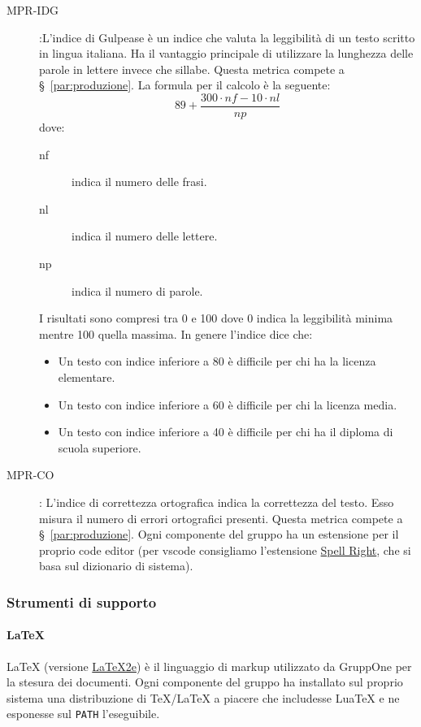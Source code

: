 \documentclass[../../norme-di-progetto.tex]{subfiles}
\begin{document}
\begin{description}
  \item [MPR-IDG]:L'indice di Gulpease è un indice che valuta la leggibilità di un testo scritto in lingua italiana. Ha il vantaggio principale di utilizzare la lunghezza delle parole in lettere invece che sillabe. Questa metrica compete a §~\ref{par:produzione}. La formula per il calcolo è la seguente:
  \[
    89 +\frac{300\cdot nf-10\cdot nl}{np}
  \]
  dove:
  \begin{description}
    \item [nf] indica il numero delle frasi.
    \item [nl] indica il numero delle lettere.
    \item [np] indica il numero di parole.
  \end{description}
  I risultati sono compresi tra 0 e 100 dove 0 indica la leggibilità minima mentre 100 quella massima. In genere l'indice dice che:
  \begin{itemize}
    \item Un testo con indice inferiore a 80 è difficile per chi ha la licenza elementare.
    \item Un testo con indice inferiore a 60 è difficile per chi la licenza media.
    \item Un testo con indice inferiore a 40 è difficile per chi ha il diploma di scuola superiore.
  \end{itemize}
  \item [MPR-CO]: L'indice di correttezza ortografica indica la correttezza del testo.
  Esso misura il numero di errori ortografici presenti.
  Questa metrica compete a §~\ref{par:produzione}.
  Ogni componente del gruppo ha un estensione per il proprio code editor (per vscode consigliamo l'estensione \href{https://marketplace.visualstudio.com/items?itemName=ban.spellright}{Spell Right}, che si basa sul dizionario di sistema).
\end{description}

\subsubsection{Strumenti di supporto}

\paragraph{\LaTeX}%
\label{par:LaTeX}
\LaTeX{} (versione \href{https://texfaq.org/FAQ-latex2e}{\LaTeX2e}) è il linguaggio di markup utilizzato da GruppOne per la stesura dei documenti.
Ogni componente del gruppo ha installato sul proprio sistema una distribuzione di \TeX{}/\LaTeX{} a piacere che includesse Lua\TeX{} e ne esponesse sul \verb|PATH| l'eseguibile.
\end{document}
